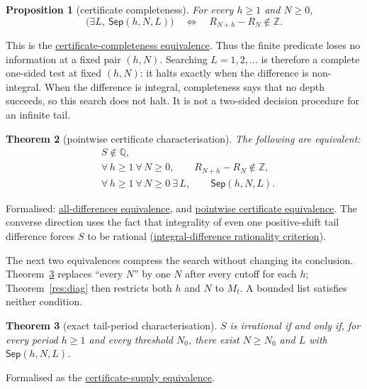 \documentclass[11pt]{article}
\newcommand{\commit}{bb4e24651b37cd096d3749ef299c3317930b3a3b}
\newcommand{\repobase}{https://github.com/wcook04/plectis-lean-erdos249-257/blob/\commit}
\newcommand{\PK}{Erdos249257}
\newcommand{\lword}[4]{\href{\repobase/\PK/#1\#L#2}{#4}}
\newtheorem{theorem}{Theorem}[section]
\newtheorem{proposition}[theorem]{Proposition}
\theoremstyle{definition}
\theoremstyle{remark}
\newcommand{\Z}{\mathbb{Z}}
\newcommand{\Q}{\mathbb{Q}}
\begin{document}
\begin{proposition}[certificate completeness]\label{res:complete}
For every $h\ge1$ and $N\ge0$,
\[
\bigl(\exists L,\ \mathsf{Sep}(h,N,L)\bigr)
\quad\Longleftrightarrow\quad
R_{N+h}-R_N\notin\Z.
\]
\end{proposition}
\noindent This is the
\lword{LcmConeFlatness.lean}{316}{exists_certifiedKill_iff_tail_diff_notMem_int}{certificate-completeness equivalence}.
Thus the finite predicate loses no information at a fixed pair \((h,N)\).
Searching \(L=1,2,\ldots\) is therefore a complete one-sided test at fixed
\((h,N)\): it halts
exactly when the difference is non-integral.  When the difference is integral,
completeness says that no depth succeeds, so this search does not halt.  It is
not a two-sided decision procedure for an infinite tail.

\begin{theorem}[pointwise certificate characterisation]
\label{res:pointwisecomplete}
The following are equivalent:
\[
\begin{aligned}
 &S\notin\Q,\\
 &\forall\,h\ge1\ \forall\,N\ge0,\qquad R_{N+h}-R_N\notin\Z,\\
 &\forall\,h\ge1\ \forall\,N\ge0\ \exists\,L,\qquad
      \mathsf{Sep}(h,N,L).
\end{aligned}
\]
\end{theorem}
\noindent Formalised:
\lword{LcmConeFlatness.lean}{386}{irrational_totient_series_iff_all_tail_diffs_nonintegral}{all-differences equivalence},
and
\lword{LcmConeFlatness.lean}{399}{irrational_totient_series_iff_pointwise_certificates}{pointwise certificate equivalence}.
The converse direction uses the fact that integrality of even one
positive-shift tail difference forces $S$ to be rational
(\lword{LcmConeFlatness.lean}{357}{not_irrational_of_tail_diff_mem_int}{integral-difference rationality criterion}).

The next two equivalences compress the search without changing its conclusion.
Theorem~\ref{res:red21} replaces ``every \(N\)'' by one \(N\) after every
cutoff for each \(h\); Theorem~\ref{res:diag} then restricts both \(h\) and
\(N\) to \(M_t\).  A bounded list satisfies neither condition.

\begin{theorem}[exact tail-period characterisation]\label{res:red21}
$S$ is irrational if and only if, for every period $h\ge1$ and every threshold
$N_0$, there exist $N\ge N_0$ and $L$ with $\mathsf{Sep}(h,N,L)$.
\end{theorem}
\noindent Formalised as the
\lword{LcmConeFlatness.lean}{412}{irrational_totient_series_iff_certificate_supply}{certificate-supply equivalence}.
\end{document}
